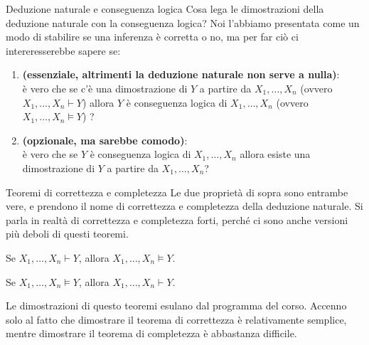 \documentclass[aspectratio=169,10pt,dvipsnames,xcolor=table,handout]{beamer}
\begin{document}
\begin{frame}{Deduzione naturale e conseguenza logica}
    Cosa lega le dimostrazioni della deduzione naturale con la conseguenza logica? Noi l'abbiamo presentata come un modo di stabilire se una inferenza è corretta o no, ma per far ciò ci intereresserebbe sapere se:
    \begin{enumerate}
        \item \textbf{(essenziale, altrimenti la deduzione naturale non serve a nulla)}:\\
        è vero che se c'è una dimostrazione di $Y$ a partire da $X_1, \ldots, X_n$ (ovvero $X_1, \ldots, X_n \vdash Y$) allora $Y$ è conseguenza logica di $X_1, \ldots, X_n$ (ovvero $X_1, \ldots, X_n \models Y$) ?
        \item \textbf{(opzionale, ma sarebbe comodo)}:\\
        è vero che se $Y$ è conseguenza logica di $X_1, \ldots, X_n$ allora esiste una dimostrazione di $Y$ a partire da $X_1, \ldots, X_n$?
    \end{enumerate}
\end{frame}

\begin{frame}{Teoremi di correttezza e completezza}
    Le due proprietà di sopra sono entrambe vere, e prendono il nome di \alert{correttezza} e \alert{completezza} della deduzione naturale.
    Si parla in realtà di correttezza e completezza \alert{forti}, perché ci sono anche versioni più deboli di questi teoremi.

    \begin{theorem}
        Se $X_1, \ldots, X_n \vdash Y$, allora $X_1, \ldots, X_n \models Y$.
    \end{theorem}

    \begin{theorem}
        Se $X_1, \ldots, X_n \models Y$, allora $X_1, \ldots, X_n \vdash Y$.
    \end{theorem}

    \medskip
    Le dimostrazioni di questo teoremi esulano dal programma del corso. Accenno solo al fatto che dimostrare il teorema di correttezza è relativamente semplice, mentre dimostrare il teorema di completezza è abbastanza difficile.
\end{frame}
\end{document}
